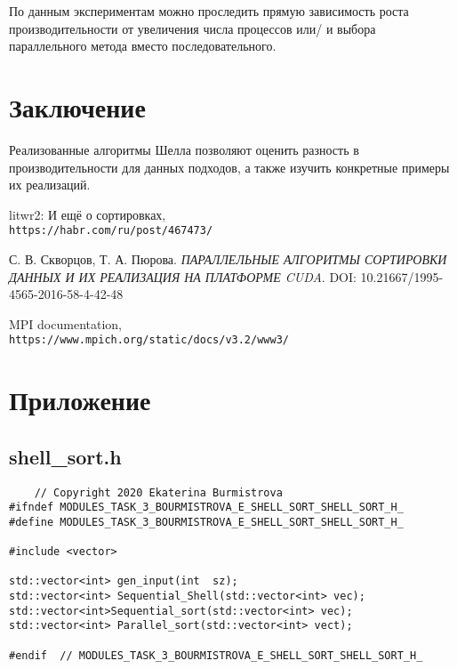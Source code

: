 \documentclass[12pt, letterpaper]{report}
\begin{document}
По данным экспериментам можно проследить прямую зависимость роста
производительности от увеличения числа процессов или/ и выбора параллельного
метода вместо последовательного.
\section{Заключение}
Реализованные алгоритмы Шелла позволяют оценить разность в производительности
для данных подходов, а также изучить конкретные примеры их реализаций.

\begin{thebibliography}{9}
litwr2: И ещё о сортировках,
\\\texttt{https://habr.com/ru/post/467473/}


С. В. Скворцов, Т. А. Пюрова. 
\textit{ПАРАЛЛЕЛЬНЫЕ АЛГОРИТМЫ СОРТИРОВКИ ДАННЫХ
И ИХ РЕАЛИЗАЦИЯ НА ПЛАТФОРМЕ CUDA}.
DOI: 10.21667/1995-4565-2016-58-4-42-48

MPI documentation,
\\\texttt{https://www.mpich.org/static/docs/v3.2/www3/}
\end{thebibliography}

\section*{Приложение}
 	\subsection*{shell\_sort.h}
 	\begin{verbatim}
 	// Copyright 2020 Ekaterina Burmistrova
#ifndef MODULES_TASK_3_BOURMISTROVA_E_SHELL_SORT_SHELL_SORT_H_
#define MODULES_TASK_3_BOURMISTROVA_E_SHELL_SORT_SHELL_SORT_H_

#include <vector>

std::vector<int> gen_input(int  sz);
std::vector<int> Sequential_Shell(std::vector<int> vec);
std::vector<int>Sequential_sort(std::vector<int> vec);
std::vector<int> Parallel_sort(std::vector<int> vect);

#endif  // MODULES_TASK_3_BOURMISTROVA_E_SHELL_SORT_SHELL_SORT_H_
 	\end{verbatim}
\end{document}
